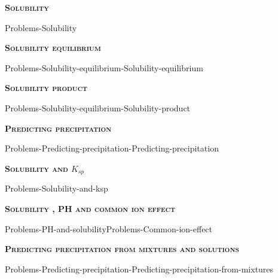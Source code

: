 \documentclass[main.tex]{subfiles}
\newcommand\chapterlabel{Ch-solubility}
\begin{document}
\newpage
 
\fancyhfoffset[E,O]{0pt}
\setlength{\columnsep}{30pt}
\begin{conclusion}
\end{conclusion}
\begin{multicols*}{2}\setcounter{numA}{1}
{\raggedright\textsc{\textbf{Solubility }}\par} {Problems-Solubility}
 
{\raggedright\textsc{\textbf{Solubility equilibrium}}\par}{Problems-Solubility-equilibrium-Solubility-equilibrium}

{\raggedright\textsc{\textbf{Solubility product}}\par} {Problems-Solubility-equilibrium-Solubility-product}
{\raggedright\textsc{\textbf{Predicting precipitation}}\par} {Problems-Predicting-precipitation-Predicting-precipitation}
 {\raggedright\textsc{\textbf{Solubility and $K_{sp}$}}\par} {Problems-Solubility-and-ksp}
 {\raggedright\textsc{\textbf{Solubility , PH and common ion effect}}\par} {Problems-PH-and-solubility}{Problems-Common-ion-effect}

   {\raggedright\textsc{\textbf{Predicting precipitation from mixtures and solutions}}\par} {Problems-Predicting-precipitation-Predicting-precipitation-from-mixtures}



\end{multicols*} \checkoddpage\ifoddpage \clearpage\thispagestyle{empty}\mbox{}\clearpage \else  \fi
{}\iftoggle{showfinalanswers}{
\begin{answerbox}
\begin{answersenvironment}
 \begin{localsize}{10}
{\Large \bf Answers}
\SetupExSheets{ headings = inline-nr , counter-format = qu) ,}
\printsolutions 
  \vspace{20cm}
 \end{localsize}
 \end{answersenvironment}
\end{answerbox}
}{}
\checkoddpage\ifoddpage \clearpage\thispagestyle{empty}\mbox{}\clearpage \else  \fi
\end{document}
